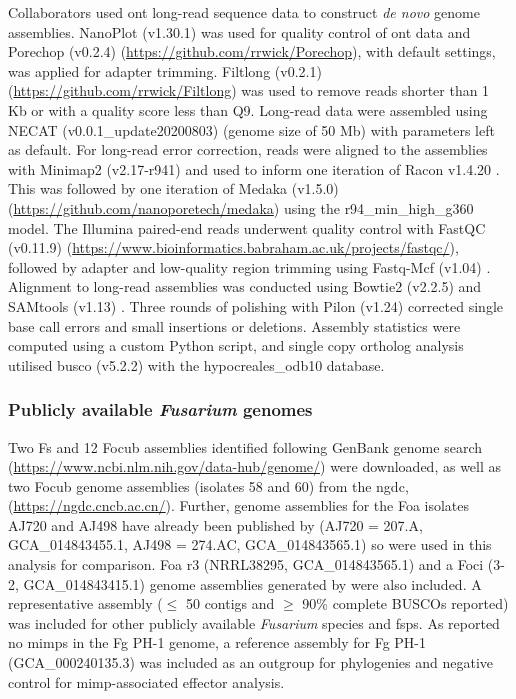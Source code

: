 Collaborators used \Ac{ont} long-read sequence data to construct \textit{de novo} genome assemblies. NanoPlot (v1.30.1) \parencite{DeCoster2018} was used for quality control of \ac{ont} data and Porechop (v0.2.4) (\href{https://github.com/rrwick/Porechop}{https://github.com/rrwic\-k/Porechop}), with default settings, was applied for adapter trimming. Filtlong (v0.2.1)  (\href{https://github.com/rrwick/Filtlong}{https://github.com/rrwick/Filtlong}) was used to remove reads shorter than 1 Kb or with a quality score less than Q9. Long-read data were assembled using NECAT (v0.0.1\_update20200803) \parencite{Chen2021} (genome size of 50 Mb) with parameters left as default. For long-read error correction, reads were aligned to the assemblies with Minimap2 (v2.17-r941) \parencite{Li2018} and used to inform one iteration of Racon v1.4.20 \parencite{Vaser2017}. This was followed by one iteration of Medaka (v1.5.0) (\href{https://github.com/nanoporetech/medaka}{https://github.com/nanoporetech/medaka}) using the r94\_min\_high\_g360 model. The Illumina paired-end reads underwent quality control with FastQC (v0.11.9) (\href{https://www.bioinformatics.babraham.ac.uk/projects/fastqc/}{https://www.bioinformatics.\-babraham.ac.uk/projects/fastqc/}), followed by adapter and low-quality region trimming using Fastq-Mcf (v1.04) \parencite{Aronesty2013}. Alignment to long-read assemblies was conducted using Bowtie2 (v2.2.5) \parencite{Langmead2012} and SAMtools (v1.13) \Parencite{Danecek2021}. Three rounds of polishing with Pilon (v1.24) \parencite{Walker2014} corrected single base call errors and small insertions or deletions. Assembly statistics were computed using a custom Python script, and single copy ortholog analysis utilised \ac{busco} (v5.2.2) \parencite{Simao2015} with the hypocreales\_odb10 database.

\subsubsection{Publicly available \textit{Fusarium} genomes}

Two \ac{Fs} and 12 \ac{Focub} assemblies identified following GenBank genome search (\href{https://www.ncbi.nlm.nih.gov/data-hub/genome}{https://ww\-w.ncbi.nlm.nih.gov/data-hub/genome/}) were downloaded, as well as two \ac{Focub} genome assemblies (isolates 58 and 60) from the \ac{ngdc}, (\href{https://ngdc.cncb.ac.cn}{https:/\-/ngdc.cncb.ac.cn/}). Further, genome assemblies for the \ac{Foa} isolates AJ720 and AJ498 have already been published by \textcite{Henry2020} (AJ720 = 207.A, GCA\_014843455.1,  AJ498 = 274.AC, GCA\_014843565.1) so were used in this analysis for comparison. \Ac{Foa} \ac{r3} (NRRL38295, GCA\_014843565.1) and a \ac{Foci} (3-2, GCA\_014843415.1) genome assemblies generated by \textcite{Henry2020} were also included. A representative assembly (\( \leq \) 50 contigs and \(\geq \) 90\% complete BUSCOs reported) was included for other publicly available \textit{Fusarium} species and \acp{fsp}. As \textcite{Schmidt2013} reported no \acp{mimp} in the \ac{Fg} PH-1 genome, a reference assembly for \ac{Fg} PH-1 (GCA\_000240135.3) was included as an outgroup for phylogenies and negative control for \ac{mimp}-associated effector analysis.

